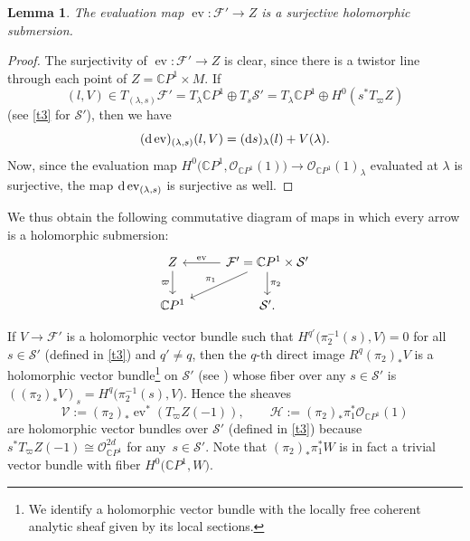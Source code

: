 \documentclass[pdftex]{sigma}
\numberwithin{equation}{section}
\newtheorem{Lemma}[Theorem]{Lemma}
\theoremstyle{definition}
\newcommand\C{{\mathbb C}}
\begin{document}
\begin{Lemma}\label{Lem:evsubmersion}
The evaluation map $\operatorname{ev}\colon \mathcal F' \longrightarrow Z$ is a surjective holomorphic submersion.
\end{Lemma}

\begin{proof}
The surjectivity of $\operatorname{ev}\colon \mathcal F' \longrightarrow Z$ is clear, since there is a twistor line through each point
of $Z = \C P^1 \times M$.
If
\[(l, V) \in T_{(\lambda,s)}\mathcal F' = T_\lambda\C P^1 \oplus T_s\mathcal S'
 = T_\lambda\C P^1 \oplus H^0(s^*T_\varpi Z)\] (see \eqref{t3} for ${\mathcal S}'$), then we have
\[
({\rm d}\operatorname{ev})_{(\lambda,s)}(l, V) = ({\rm d}s)_\lambda(l)+V(\lambda).
\]
Now, since the evaluation map $H^0\bigl(\C P^1, {\mathcal O}_{\C P^1}(1)\bigr) \longrightarrow \mathcal{O}_{\C P^1}(1)_\lambda$ evaluated
at $\lambda$ is surjective,
the map ${\rm d}\operatorname{ev}_{(\lambda,s)}$ is surjective as well.
\end{proof}

We thus obtain the following commutative diagram of maps in which every arrow is a holomorphic submersion:
\begin{equation}\label{eq: doublefibration}
\begin{tikzcd}
Z \arrow[r, leftarrow, "\operatorname{ev}"] \arrow[d, "\varpi"'] & \mathcal F' =
\C P^1 \times \mathcal{S}' \arrow[dl, "\pi_1"'] \arrow[d, "\pi_2"] \\
\C P^1 & \mathcal{S}'.
\end{tikzcd}
\end{equation}

If $V \longrightarrow \mathcal F'$ is a holomorphic vector bundle such that $H^{q'}\bigl(\pi_2^{-1}(s), V\bigr) = 0$ for all
$s \in {\mathcal S}'$ (defined in \eqref{t3}) and $q' \not= q$, then the $q$-th direct image $R^q (\pi_2)_*V$
is a holomorphic vector bundle\footnote{We identify a holomorphic vector bundle with the locally free coherent analytic
sheaf given by its local sections.} on $\mathcal S'$ (see \cite[Chapter~10]{GrauertRemmert}) whose fiber over any $s \in \mathcal{S}'$
is $((\pi_2)_*V)_s = H^q\bigl(\pi_2^{-1}(s), V\bigr)$.
Hence the sheaves
\begin{equation}\label{eq: defEH}
\mathcal V := (\pi_2)_*\operatorname{ev}^*(T_\varpi Z(-1)), \qquad \mathcal H := (\pi_2)_*\pi_1^*\mathcal{O}_{\C P^1}(1)
\end{equation}
are holomorphic vector bundles over $\mathcal{S}'$ (defined in \eqref{t3}) because $s^*T_\varpi Z(-1) \cong \mathcal{O}_{\C P^1}^{2d}$
for any~${s \in \mathcal S'}$. Note that $(\pi_2)_*\pi_1^*W$ is in fact a trivial vector bundle with fiber $H^0\bigl(\C P^1, W\bigr)$.
\end{document}
